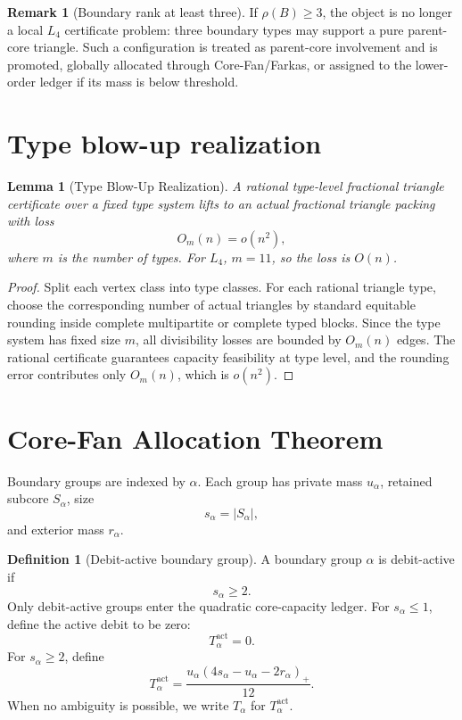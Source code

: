\documentclass[11pt]{article}
\newtheorem{lemma}[theorem]{Lemma}
\theoremstyle{definition}
\newtheorem{definition}[theorem]{Definition}
\newtheorem{remark}[theorem]{Remark}
\begin{document}
\begin{remark}[Boundary rank at least three]
If \(\rho(B)\ge3\), the object is no longer a local \(L_4\) certificate problem: three boundary types may support a pure parent-core triangle. Such a configuration is treated as parent-core involvement and is promoted, globally allocated through Core-Fan/Farkas, or assigned to the lower-order ledger if its mass is below threshold.
\end{remark}

\section{Type blow-up realization}

\begin{lemma}[Type Blow-Up Realization]\label{lem:type-blowup}
A rational type-level fractional triangle certificate over a fixed type system lifts to an actual fractional triangle packing with loss
\[
    O_m(n)=o(n^2),
\]
where \(m\) is the number of types. For \(L_4\), \(m=11\), so the loss is \(O(n)\).
\end{lemma}

\begin{proof}
Split each vertex class into type classes. For each rational triangle type, choose the corresponding number of actual triangles by standard equitable rounding inside complete multipartite or complete typed blocks. Since the type system has fixed size \(m\), all divisibility losses are bounded by \(O_m(n)\) edges. The rational certificate guarantees capacity feasibility at type level, and the rounding error contributes only \(O_m(n)\), which is \(o(n^2)\).
\end{proof}

\section{Core-Fan Allocation Theorem}

Boundary groups are indexed by \(\alpha\). Each group has private mass \(u_\alpha\), retained subcore \(S_\alpha\), size
\[
    s_\alpha=|S_\alpha|,
\]
and exterior mass \(r_\alpha\).

\begin{definition}[Debit-active boundary group]
A boundary group \(\alpha\) is debit-active if
\[
    s_\alpha\ge2.
\]
Only debit-active groups enter the quadratic core-capacity ledger. For \(s_\alpha\le1\), define the active debit to be zero:
\[
    T_\alpha^{\mathrm{act}}=0.
\]
For \(s_\alpha\ge2\), define
\[
    T_\alpha^{\mathrm{act}}
    =
    \frac{u_\alpha(4s_\alpha-u_\alpha-2r_\alpha)_+}{12}.
\]
When no ambiguity is possible, we write \(T_\alpha\) for \(T_\alpha^{\mathrm{act}}\).
\end{definition}
\end{document}
